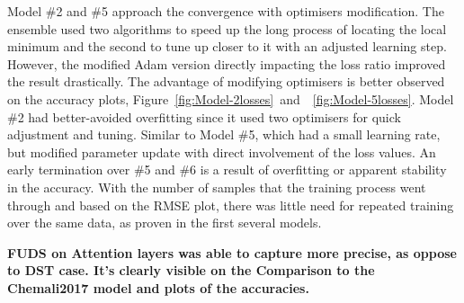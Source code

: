 %
%
Model \#2 and \#5 approach the convergence with optimisers modification.
The ensemble used two algorithms to speed up the long process of locating the local minimum and the second to tune up closer to it with an adjusted learning step.
However, the modified Adam version directly impacting the loss ratio improved the result drastically.
The advantage of modifying optimisers is better observed on the accuracy plots, \mbox{Figure~\ref{fig:Model-2losses} and ~\ref{fig:Model-5losses}}.
Model \#2 had better-avoided overfitting since it used two optimisers for quick adjustment and tuning.
Similar to Model \#5, which had a small learning rate, but modified parameter update with direct involvement of the loss values.
An early termination over \#5 and \#6 is a result of overfitting or apparent stability in the accuracy.
With the number of samples that the training process went through and based on the RMSE plot, there was little need for repeated training over the same data, as proven in the first several models.

\textbf{FUDS on Attention layers was able to capture more precise, as oppose to DST case. It's clearly visible on the Comparison to the Chemali2017 model and plots of the accuracies.}
%

